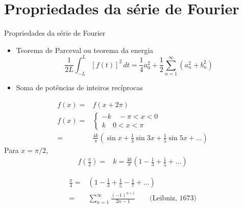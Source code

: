       \section[ slide = true]{Propriedades da série de Fourier}
      \begin{slide}[toc = ]{Propriedades da série de Fourier}
		      \begin{itemize}
			      \item Teorema de Parceval ou teorema da energia
				      \begin{equation*}
					      \frac{1}{2L} \int_{-L}^L [f(t)]^2\, dt = \frac{1}{4}a_0^2 + \frac{1}{2}\sum_{n=1}^\infty (a_n^2+b_n^2)	 
			      	      \end{equation*}
			      \item Soma de potências de inteiros recíprocas
		      \end{itemize}
	      \twocolumn
	      {
				      \begin{align*}
					      f(x) =& f(x+2\pi)\\
					      f(x) =& \begin{cases} -k \quad -\pi < x < 0\\k \quad 0<x<\pi\end{cases}\\
						   =& \frac{4k}{\pi}\left (\sin x + \frac{1}{3}\sin 3x + \frac{1}{5}\sin 5x  + \dots \right )
				      \end{align*}
				      Para $x = \pi/2$,
				      \begin{align*}
					      f\left (\frac{\pi}{2} \right ) =& k = \frac{4k}{\pi}\left (1 - \frac{1}{3} + \frac{1}{5} + \dots \right )
				      \end{align*}
	      }
	      {
		      \begin{align*}
			      \frac{\pi}{4} =&\left (1 - \frac{1}{3} + \frac{1}{5} - \frac{1}{7} + \dots \right )\\
					    =&\sum_{n=1}^\infty \frac{(-1)^{n+1}}{2n-1}\qquad \text{(Leibniz, 1673)}
		      \end{align*} 

	      }

      \end{slide}
